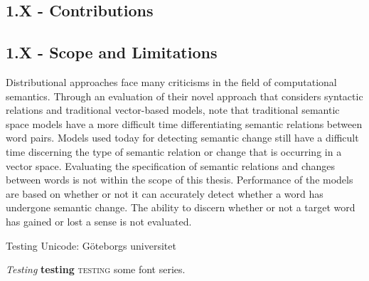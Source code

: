 \subsection{1.X - Contributions}

\subsection{1.X - Scope and Limitations}
\label{intro-scope}
Distributional approaches face many criticisms in the field of computational semantics. Through an evaluation of their novel approach that considers syntactic relations and traditional vector-based models, \citet{pado-lapata-2003-constructing} note that traditional semantic space models have a more difficult time differentiating semantic relations between word pairs. Models used today for detecting semantic change still have a difficult time discerning the type of semantic relation or change that is occurring in a vector space. Evaluating the specification of semantic relations and changes between words is not within the scope of this thesis. Performance of the models are based on whether or not it can accurately detect whether a word has undergone semantic change. The ability to discern whether or not a target word has gained or lost a sense is not evaluated. 


Testing Unicode: Göteborgs universitet

\textit{Testing} \textbf{testing} \textsc{testing} some font series.
